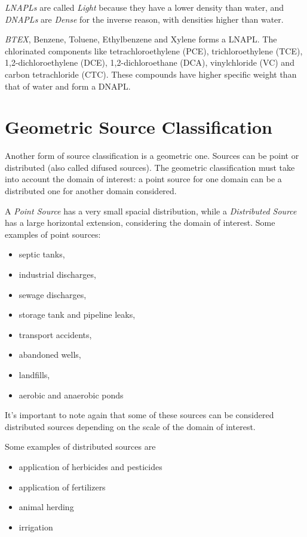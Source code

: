 \documentclass[11pt,twoside]{report}
\begin{document}
\textit{LNAPLs} are called \textit{Light} because they have a lower density than water, and \textit{DNAPLs} are \textit{Dense} for the inverse reason, with densities higher than water. 

\textit{BTEX}, Benzene, Toluene, Ethylbenzene and Xylene forms a LNAPL. The chlorinated components like  
tetrachloroethylene (PCE), trichloroethylene (TCE), 1,2-dichloroethylene (DCE), 1,2-dichloroethane (DCA),  vinylchloride (VC) and carbon tetrachloride (CTC). These compounds have higher specific weight than that of water and form a DNAPL.

\section{Geometric Source Classification}
Another form of source classification is a geometric one. Sources can be point or distributed (also called difused sources). The geometric classification must take into account the domain of interest: a point source for one domain can be a distributed one for another domain considered. 

A \textit{Point Source} has a very small spacial distribution, while a \textit{Distributed Source} has a large horizontal extension, considering the domain of interest. Some examples of point sources:

\begin{itemize}
   \item septic tanks,
   \item industrial discharges,
   \item sewage discharges,
   \item storage tank and pipeline leaks,
   \item transport accidents,
   \item abandoned wells,
   \item landfills, 
   \item aerobic and anaerobic ponds
\end{itemize}

It's important to note again that some of these sources can be considered distributed sources depending on the scale of the domain of interest.

Some examples of distributed sources are
\begin{itemize}
   \item application of herbicides and pesticides
   \item application of fertilizers
   \item animal herding
   \item irrigation
\end{itemize}
\end{document}
